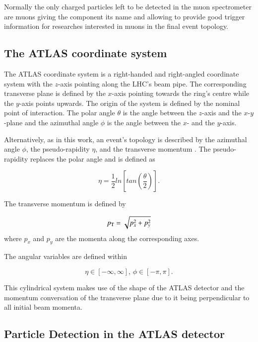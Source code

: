 Normally the only charged particles left to be detected in the muon spectrometer are muons giving the component its name and allowing to provide good trigger information for researches interested in muons in the final event topology.




\subsection{The ATLAS coordinate system}

The ATLAS coordinate system is a right-handed and right-angled coordinate system with the $z$-axis pointing along the LHC's beam pipe. The corresponding transverse plane is defined by the $x$-axis pointing towards the ring's centre while the $y$-axis points upwards. The origin of the system is defined by the nominal point of interaction. The polar angle $\theta$ is the angle between the $z$-axis and the $x$-$y$-plane and the azimuthal angle $\phi$ is the angle between the $x$- and the $y$-axis.

Alternatively, as in this work, an event's topology is described by the azimuthal angle $\phi$, the pseudo-rapidity $\eta$, and the transverse momentum \pT. The pseudo-rapidity replaces the polar angle and is defined as

\begin{equation}
\eta = \frac{1}{2} ln\left[ tan\left(\frac{\theta}{2}\right)\right].
\end{equation}

The transverse momentum is defined by

\begin{equation}
p_{\text{T}} = \sqrt{p_x^2 + p_y^2}
\end{equation}
where $p_x$ and $p_y$ are the momenta along the corresponding axes. 

The angular variables are defined within

\begin{equation}
\eta \in [-\infty,\infty],\,
\phi \in [-\pi,\pi].
\end{equation}

This cylindrical system makes use of the shape of the ATLAS detector and the momentum conversation of the transverse plane due to it being perpendicular to all initial beam momenta.

\subsection{Particle Detection in the ATLAS detector}


